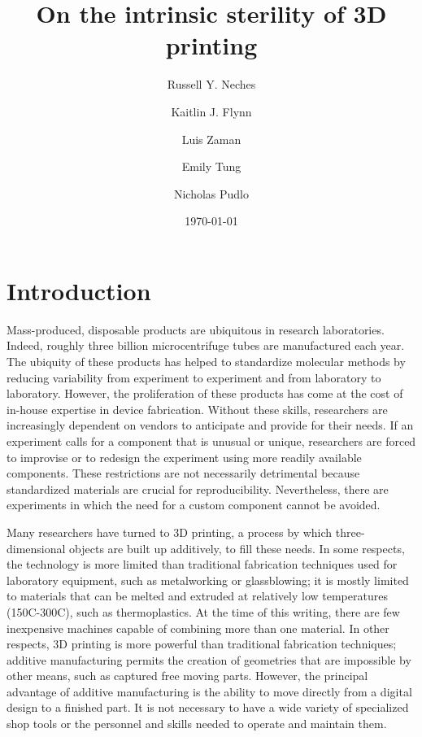 \documentclass[fleqn,10pt]{wlpeerj}
\title{On the intrinsic sterility of 3D printing}
\author[1]{Russell Y. Neches}
\author[2]{Kaitlin J. Flynn}
\author[3,4]{Luis Zaman}
\author[5]{Emily Tung}
\author[2]{Nicholas Pudlo}
\affil[1]{U.C. Davis Genome Center}
\affil[2]{University of Michigan}
\affil[3]{Michigan State University}
\affil[4]{University of Washington}
\affil[5]{Pivot Bio}
\date{\today}
\begin{document}
\flushbottom
\maketitle
\thispagestyle{empty}


\section{Introduction}

Mass-produced, disposable products are ubiquitous in research laboratories.
Indeed, roughly three billion microcentrifuge tubes are manufactured each
year. \cite{eppy} The ubiquity of these products has helped to standardize
molecular methods by reducing variability from experiment to experiment and
from laboratory to laboratory. However, the proliferation of these products
has come at the cost of in-house expertise in device fabrication. Without
these skills, researchers are increasingly dependent on vendors to anticipate
and provide for their needs. If an experiment calls for a component that is
unusual or unique, researchers are forced to improvise or to redesign the
experiment using more readily available components. These restrictions are not
necessarily detrimental because standardized materials are crucial for
reproducibility. Nevertheless, there are experiments in which the need for a
custom component cannot be avoided.

Many researchers have turned to 3D printing, a process by which three-
dimensional objects are built up additively, to fill these needs. In some
respects, the technology is more limited than traditional fabrication
techniques used for laboratory equipment, such as metalworking or
glassblowing; it is mostly limited to materials that can be melted and
extruded at relatively low temperatures (150C-300C), such as thermoplastics.
At the time of this writing, there are few inexpensive machines capable of
combining more than one material. In other respects, 3D printing is more
powerful than traditional fabrication techniques; additive manufacturing
permits the creation of geometries that are impossible by other means, such as
captured free moving parts. However, the principal advantage of additive
manufacturing is the ability to move directly from a digital design to a
finished part. It is not necessary to have a wide variety of specialized shop
tools or the personnel and skills needed to operate and maintain them.
\end{document}
